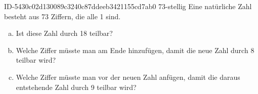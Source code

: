 \begin{exercise}
      {ID-5430c02d130089c3240c87ddeeb3421155cd7ab0}
      {73-stellig}
  \ifproblem\problem
    Eine natürliche Zahl besteht aus 73 Ziffern, die alle 1 sind.
    \begin{enumerate}[a)]
      \item Ist diese Zahl durch 18 teilbar?
      \item Welche Ziffer müsste man am Ende hinzufügen, damit die
            neue Zahl durch 8 teilbar wird?
      \item Welche Ziffer müsste man vor der neuen Zahl anfügen,
            damit die daraus entstehende Zahl durch 9 teilbar wird?
    \end{enumerate}
  \fi
\end{exercise}
